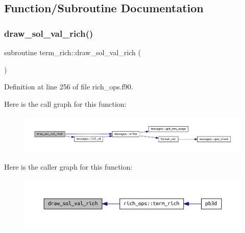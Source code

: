 \subsection{Function/\+Subroutine Documentation}
\mbox{\label{rich__ops_8f90_ac79849bfcf0a924774e4c4b601fc19d8}} 
\subsubsection{\texorpdfstring{draw\+\_\+sol\+\_\+val\+\_\+rich()}{draw\_sol\_val\_rich()}}
{\footnotesize\ttfamily subroutine term\+\_\+rich\+::draw\+\_\+sol\+\_\+val\+\_\+rich (\begin{DoxyParamCaption}{ }\end{DoxyParamCaption})}



Definition at line 256 of file rich\+\_\+ops.\+f90.

Here is the call graph for this function\+:
\nopagebreak
\begin{figure}[H]
\begin{center}
\leavevmode
\includegraphics[width=350pt]{rich__ops_8f90_ac79849bfcf0a924774e4c4b601fc19d8_cgraph}
\end{center}
\end{figure}
Here is the caller graph for this function\+:
\nopagebreak
\begin{figure}[H]
\begin{center}
\leavevmode
\includegraphics[width=350pt]{rich__ops_8f90_ac79849bfcf0a924774e4c4b601fc19d8_icgraph}
\end{center}
\end{figure}
